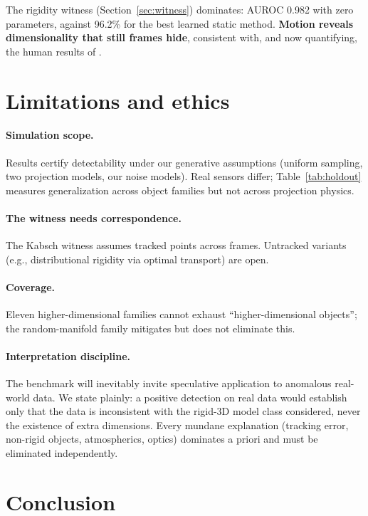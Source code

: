 \documentclass{article}
\begin{document}
The rigidity witness (Section~\ref{sec:witness}) dominates: AUROC 0.982 with zero parameters, against 96.2\% for the best learned static method. \textbf{Motion reveals dimensionality that still frames hide}, consistent with, and now quantifying, the human results of \citet{he2023rigidity}.

\section{Limitations and ethics}

\paragraph{Simulation scope.} Results certify detectability under our generative assumptions (uniform sampling, two projection models, our noise models). Real sensors differ; Table~\ref{tab:holdout} measures generalization across object families but not across projection physics.

\paragraph{The witness needs correspondence.} The Kabsch witness assumes tracked points across frames. Untracked variants (e.g., distributional rigidity via optimal transport) are open.

\paragraph{Coverage.} Eleven higher-dimensional families cannot exhaust ``higher-dimensional objects''; the random-manifold family mitigates but does not eliminate this.

\paragraph{Interpretation discipline.} The benchmark will inevitably invite speculative application to anomalous real-world data. We state plainly: a positive detection on real data would establish only that the data is inconsistent with the rigid-3D model class considered, never the existence of extra dimensions. Every mundane explanation (tracking error, non-rigid objects, atmospherics, optics) dominates a priori and must be eliminated independently.

\section{Conclusion}
\end{document}

